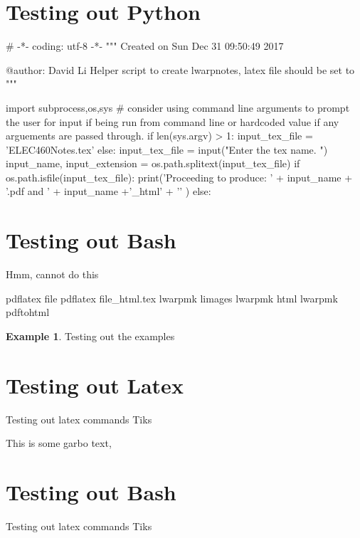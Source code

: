\documentclass{scrreprt}
\theoremstyle{plain}
\theoremstyle{definition}
\newtheorem{example}{Example}[section]
\theoremstyle{remark}
\begin{document}
\section{Testing out Python}
\begin{pythonscript}{}
# -*- coding: utf-8 -*-
"""
Created on Sun Dec 31 09:50:49 2017

@author: David Li
Helper script to create lwarpnotes, latex file should be set to \nonstopmode
"""

import subprocess,os,sys
# consider using command line arguments to prompt the user for input if being run from command line or hardcoded value if any arguements are passed through.
if len(sys.argv) > 1:
input_tex_file = 'ELEC460Notes.tex'
else:
input_tex_file = input("Enter the tex name. ")
input_name, input_extension = os.path.splitext(input_tex_file)
if os.path.isfile(input_tex_file):
print('Proceeding to produce: ' + input_name + '.pdf and ' + input_name +'_html' + '\n' )
else:
\end{pythonscript}

\section{Testing out Bash}
Hmm, cannot do this
\begin{bashcmd}{}
	
pdflatex file
pdflatex file_html.tex
lwarpmk limages
lwarpmk html
lwarpmk pdftohtml
\end{bashcmd}

\begin{example}
	Testing out the examples
\end{example}

\section{Testing out Latex}
\begin{latexcmd}{}
	Testing out latex commands
	Tiks
\end{latexcmd}

This is some garbo text,

\section{Testing out Bash}


\begin{bashcmd}{}
	Testing out latex commands
	Tiks
\end{bashcmd}
\end{document}
